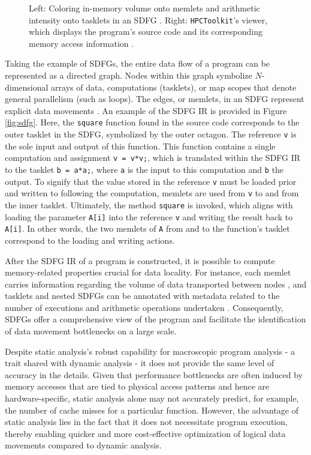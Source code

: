 \begin{figure}
\begin{subfigure}[c]{.68\textwidth}
	\end{subfigure}
	\caption{Left: Coloring in-memory volume onto memlets and arithmetic intensity onto tasklets in an SDFG \cite{schaad2021boosting}. Right: \texttt{HPCToolkit}'s viewer, which displays the program's source code and its corresponding memory access information \cite{adhianto2010hpctoolkit}.}
	\label{fig:coarse}
\end{figure}

Taking the example of SDFGs, the entire data flow of a program can be represented as a directed graph. Nodes within this graph symbolize $N$-dimensional arrays of data, computations (tasklets), or map scopes that denote general parallelism (such as loops). The edges, or memlets, in an SDFG represent explicit data movements \cite{ben2019statefulSDFG}. An example of the SDFG IR is provided in Figure \ref{fig:sdfg}. Here, the \texttt{square} function found in the source code corresponds to the outer tasklet in the SDFG, symbolized by the outer octagon. The reference \texttt{v} is the sole input and output of this function. This function contains a single computation and assignment \texttt{v = v*v;}, which is translated within the SDFG IR to the tasklet \texttt{b = a*a;}, where \texttt{a} is the input to this computation and \texttt{b} the output. To signify that the value stored in the reference \texttt{v} must be loaded prior and written to following the computation, memlets are used from \texttt{v} to and from the inner tasklet. Ultimately, the method \texttt{square} is invoked, which aligns with loading the parameter \texttt{A[i]} into the reference \texttt{v} and writing the result back to \texttt{A[i]}. In other words, the two memlets of \texttt{A} from and to the function's tasklet correspond to the loading and writing actions.

After the SDFG IR of a program is constructed, it is possible to compute memory-related properties crucial for data locality. For instance, each memlet carries information regarding the volume of data transported between nodes \cite{ben2019statefulSDFG}, and tasklets and nested SDFGs can be annotated with metadata related to the number of executions and arithmetic operations undertaken \cite{schaad2021boosting}. Consequently, SDFGs offer a comprehensive view of the program and facilitate the identification of data movement bottlenecks on a large scale.

Despite static analysis's robust capability for macroscopic program analysis - a trait shared with dynamic analysis - it does not provide the same level of accuracy in the details. Given that performance bottlenecks are often induced by memory accesses that are tied to physical access patterns and hence are hardware-specific, static analysis alone may not accurately predict, for example, the number of cache misses for a particular function. However, the advantage of static analysis lies in the fact that it does not necessitate program execution, thereby enabling quicker and more cost-effective optimization of logical data movements compared to dynamic analysis.

